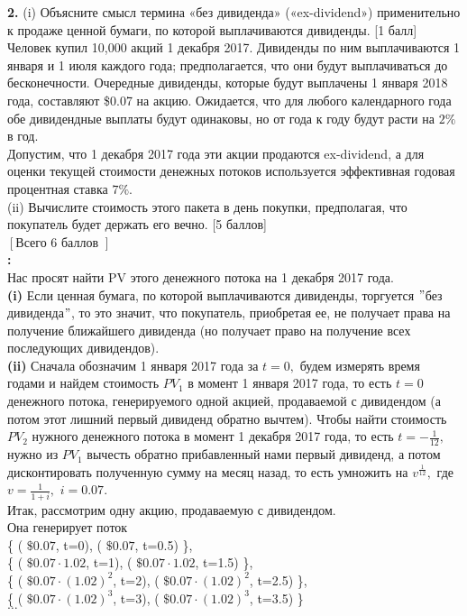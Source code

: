 \documentclass{article}
\begin{document}
{\bf \large 2.} (i) Объясните смысл термина «без дивиденда» («ex-dividend») применительно к продаже ценной бумаги, по которой выплачиваются дивиденды. [1 балл]\\
Человек купил 10,000 акций 1 декабря 2017. Дивиденды по ним выплачиваются 1 января и 1 июля каждого года; предполагается, что они будут выплачиваться до бесконечности. Очередные дивиденды, которые будут выплачены 1 января 2018 года, составляют \$0.07 на акцию. Ожидается, что для любого календарного года обе дивидендные выплаты будут одинаковы, но от года к году будут расти на $2\%$ в год.\\
Допустим, что 1 декабря 2017 года эти акции продаются ex-dividend, а для оценки текущей стоимости денежных потоков используется эффективная годовая процентная ставка $7\%.$\\
(ii) Вычислите стоимость этого пакета в день покупки, предполагая, что покупатель будет держать его вечно. [5 баллов]\\
$\left[\right. $Всего 6 баллов $\left.\right]$\\

{\bf {}:}\\
Нас просят найти PV этого денежного потока на 1 декабря 2017 года. \\

{\bf \large  (i)} Если ценная бумага, по которой выплачиваются дивиденды,  торгуется $"$без дивиденда$"$, то это значит, что покупатель, приобретая ее, не получает права на получение ближайшего дивиденда (но получает право на получение всех последующих дивидендов).\\

{\bf \large  (ii)} Сначала обозначим 1 января  2017 года за $t=0,$ будем измерять время годами и найдем  стоимость $PV_1$ в момент 1 января  2017 года, то есть $t=0$   денежного потока, генерируемого одной акцией, продаваемой с дивидендом (а потом этот лишний первый дивиденд обратно вычтем).  Чтобы найти стоимость $PV_2$ нужного денежного потока в момент  1 декабря 2017 года, то есть $t= - \frac {1}{12},$ нужно из  $PV_1$ вычесть обратно прибавленный нами первый дивиденд, а потом дисконтировать полученную сумму на месяц назад, то есть умножить на $v^{\frac {1}{12}},$ где $v=\frac {1}{1+i},$ $i=0.07.$\\

Итак, рассмотрим одну акцию, продаваемую с дивидендом.\\
Она генерирует поток\\
\{ ( $\$0.07  $, t=0), ( $\$0.07  $, t=0.5) \},  \\
\{ ( $\$0.07 \cdot 1.02 $, t=1), ( $\$0.07 \cdot 1.02 $, t=1.5) \},  \\
\{ ( $\$0.07 \cdot (1.02)^2 $, t=2), ( $\$0.07 \cdot (1.02)^2$, t=2.5) \},  \\
\{ ( $\$0.07 \cdot (1.02)^3 $, t=3), ( $\$0.07 \cdot (1.02)^3$, t=3.5) \} \\
$\dots$\\
\end{document}
